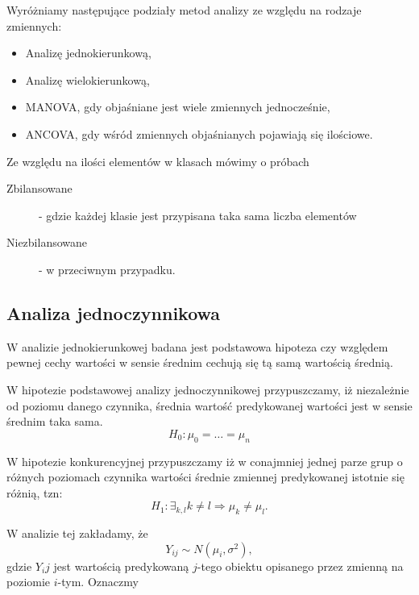 \documentclass[10pt,a4paper]{book}
\begin{document}
Wyróżniamy następujące podziały metod analizy ze względu na rodzaje zmiennych:
\begin{itemize}
\item Analizę jednokierunkową,
\item Analizę wielokierunkową,
\item MANOVA, gdy objaśniane jest wiele zmiennych jednocześnie,
\item ANCOVA, gdy wśród zmiennych objaśnianych pojawiają się ilościowe.
\end{itemize}
Ze względu na ilości elementów w klasach mówimy o próbach
\begin{description}
\item[Zbilansowane] - gdzie każdej klasie jest przypisana taka sama liczba elementów 
\item[Niezbilansowane] - w przeciwnym przypadku.
\end{description}

\subsection{Analiza jednoczynnikowa}

W analizie jednokierunkowej badana jest podstawowa hipoteza czy względem pewnej cechy wartości w sensie średnim cechują się tą samą wartością średnią. 
\begin{definition}
W hipotezie podstawowej analizy jednoczynnikowej przypuszczamy, iż niezależnie od poziomu danego czynnika, średnia wartość predykowanej wartości jest w sensie średnim taka sama.
\begin{equation*}
H_0 : \mu_0 = \ldots = \mu_n
\end{equation*}
\end{definition}

\begin{definition}
W hipotezie konkurencyjnej przypuszczamy iż w conajmniej jednej parze grup o różnych poziomach czynnika wartości średnie zmiennej predykowanej istotnie się różnią, tzn:
\begin{equation*}
H_1 : \exists_{k,l} k \neq l \Rightarrow \mu_k \neq \mu_l.
\end{equation*}
\end{definition}

W analizie tej zakładamy, że 
$$
Y_{ij} \sim N(\mu_i, \sigma^2),
$$
gdzie $Y_ij$ jest wartością predykowaną $j$-tego obiektu opisanego przez zmienną na poziomie $i$-tym. Oznaczmy
\end{document}
